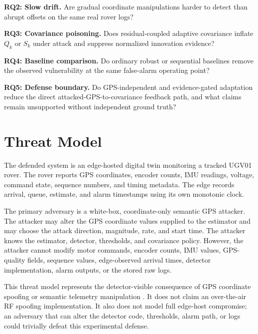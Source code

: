 \documentclass[conference]{IEEEtran}
\begin{document}
\textbf{RQ2: Slow drift.} Are gradual coordinate manipulations harder to
detect than abrupt offsets on the same real rover logs?

\textbf{RQ3: Covariance poisoning.} Does residual-coupled adaptive covariance
inflate $Q_k$ or $S_k$ under attack and suppress normalized innovation
evidence?

\textbf{RQ4: Baseline comparison.} Do ordinary robust or sequential baselines
remove the observed vulnerability at the same false-alarm operating point?

\textbf{RQ5: Defense boundary.} Do GPS-independent and evidence-gated
adaptation reduce the direct attacked-GPS-to-covariance feedback path, and
what claims remain unsupported without independent ground truth?

\section{Threat Model}
\label{sec:threat_model}

The defended system is an edge-hosted digital twin monitoring a tracked UGV01
rover. The rover reports GPS coordinates, encoder counts, IMU readings,
voltage, command state, sequence numbers, and timing metadata. The edge records
arrival, queue, estimate, and alarm timestamps using its own monotonic clock.

The primary adversary is a white-box, coordinate-only semantic GPS attacker.
The attacker may alter the GPS coordinate values supplied to the estimator and
may choose the attack direction, magnitude, rate, and start time. The attacker
knows the estimator, detector, thresholds, and covariance policy. However, the
attacker cannot modify motor commands, encoder counts, IMU values, GPS-quality
fields, sequence values, edge-observed arrival times, detector implementation,
alarm outputs, or the stored raw logs.

This threat model represents the detector-visible consequence of GPS
coordinate spoofing or semantic telemetry manipulation \cite{ref2,ref60}. It does not claim an
over-the-air RF spoofing implementation. It also does not model full edge-host
compromise; an adversary that can alter the detector code, thresholds, alarm
path, or logs could trivially defeat this experimental defense.
\end{document}
